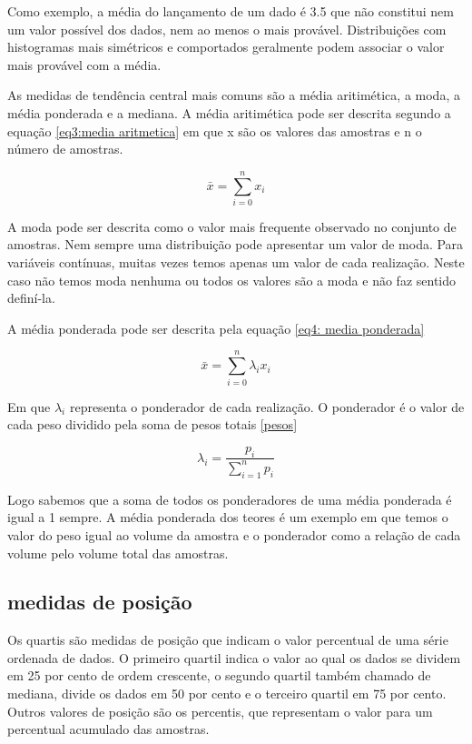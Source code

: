 Como exemplo, a média do lançamento de um dado é 3.5 que não constitui nem um valor possível dos dados, nem ao menos o mais provável. Distribuições com histogramas mais simétricos e comportados geralmente podem associar o valor mais provável com a média.  

As medidas de tendência central mais comuns são a média aritimética, a moda, a média ponderada e a mediana. A média aritimética pode ser descrita segundo a equação \eqref{eq3:media aritmetica} em que x são os valores das amostras e n o número de amostras.   

\begin{equation}\label{eq3:media aritmetica}
\bar{x} = \sum_{i = 0}^{n} x_i
\end{equation}

A moda pode ser descrita como o valor mais frequente observado no conjunto de amostras. Nem sempre uma distribuição pode apresentar um valor de moda. Para variáveis contínuas, muitas vezes temos apenas um valor de cada realização. Neste caso não temos moda nenhuma ou todos os valores são a moda e não faz sentido definí-la. 

A média ponderada pode ser descrita pela equação \eqref{eq4: media ponderada}

\begin{equation}\label{eq4: media ponderada}
\bar{x} = \sum_{i = 0}^{n} \lambda_i x_i
\end{equation}

Em que $\lambda_i$ representa o ponderador de cada realização. O ponderador é o valor de cada peso dividido pela soma de pesos totais \eqref{pesos} 
 
\begin{equation}\label{pesos}
\lambda_i = \frac{p_i}{\sum_{i=1}^{n}p_i}
\end{equation}

Logo sabemos que a soma de todos os ponderadores de uma média ponderada é igual a 1 sempre. A média ponderada dos teores é um exemplo em que temos o valor do peso igual ao volume da amostra e o ponderador como a relação de cada volume pelo volume total das amostras. 


\subsection{medidas de posição}

Os quartis são medidas de posição que indicam o valor percentual de uma série ordenada de dados. O primeiro quartil indica o valor ao qual os dados se dividem em 25 por cento de ordem crescente, o segundo quartil também chamado de mediana, divide os dados em 50 por cento e o terceiro quartil em 75 por cento. Outros valores de posição são os percentis, que representam o valor para um percentual acumulado das amostras. 

